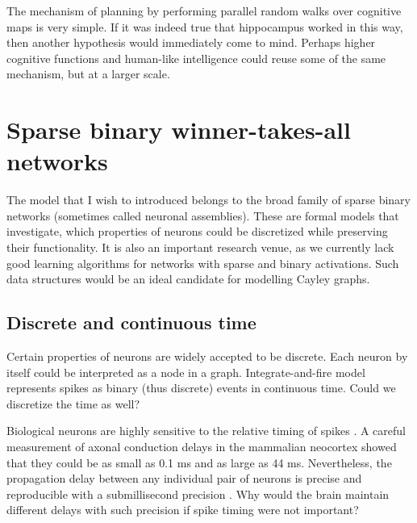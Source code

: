 \documentclass[12pt]{article}
\begin{document}
The mechanism of planning by performing parallel random walks over cognitive maps is very simple. If it was indeed true that hippocampus worked in this way, then another hypothesis would immediately come to mind. Perhaps higher cognitive functions and human-like intelligence could reuse some of the same mechanism, but at a larger scale. 

\section{Sparse binary winner-takes-all networks}

The model that I wish to introduced belongs to the broad family of sparse binary networks (sometimes called neuronal assemblies). These are formal models that investigate, which properties of neurons could be discretized while preserving their functionality. It is also an important research venue, as we currently lack good learning algorithms for networks with sparse and binary activations. Such data structures would be an ideal candidate for modelling Cayley graphs. 

\subsection{Discrete and continuous time}

Certain properties of neurons are widely accepted to be discrete. Each neuron by itself could be interpreted as a node in a graph. Integrate-and-fire model represents spikes as binary (thus discrete) events in continuous time. Could we discretize the time as well?

Biological neurons are highly sensitive to the relative timing of spikes \cite{lindsey,prut,villa,tetko}. A careful measurement of axonal conduction delays in the
mammalian neocortex \cite{Swadlow1985,Swadlow1988,Swadlow1992} showed that they could
be as small as 0.1 ms and as large as 44 ms. Nevertheless, the propagation delay
between any individual pair of neurons is precise and reproducible with a
submillisecond precision \cite{Swadlow1985,Swadlow1994}. Why would
the brain maintain different delays with such precision if spike timing were
not important? 
\end{document}
